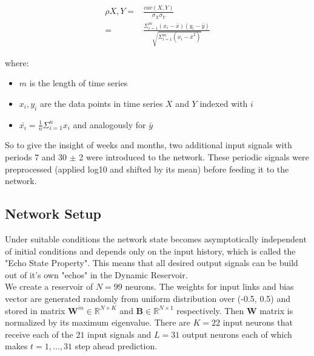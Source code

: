   \begin{equation}
  \begin{split}
	  \rho X,Y =& \frac{cov(X,Y)}{\sigma_X \sigma_Y}\\
		=& \frac{\Sigma^{m}_{i=1}(x_i - \bar{x})(y_i - \bar{y})} {\sqrt{\Sigma^m_{i=1}(x_i - \bar{x}^2)}}
  \end{split}
   \label{eq:pearson}
  \end{equation}
  
  where:
  \begin{itemize}
	  \item $m$ is the length of time series
	  \item $x_i, y_i$ are the data points in time series $X$ and $Y$ indexed with $i$
	  \item $\bar{x_i} = \frac{1}{n}\Sigma_{i=1}^{n}x_i$  and analogously for $\bar{y}$
	  
	  \end{itemize}
 
 
 So to give the insight of weeks and months, two additional input signals with periods 7 and 30 $\pm$ 2 were introduced to the network. These periodic signals were preprocessed (applied log10 and shifted by its mean) before feeding it to the network.



%


\subsection{Network Setup}
\indent \indent
    Under suitable conditions the network state becomes asymptotically independent of initial conditions and depends only on the input history, which is called the "Echo State Property". This means that all desired output signals can be build out of it's own "echos" in the Dynamic Reservoir. \cite{ESNinAudioProcessing}\\
	We create a reservoir of $N = 99$ neurons. %
	   The weights  for input links  
	 and bias vector 
	 are generated randomly from uniform distribution over (-0.5, 0.5) and stored in matrix $\mathbf{W}^{in} \in \mathbb{R}^{N\times K}$  and $\mathbf{B} \in \mathbb{R}^{N\times 1}$ respectively. Then 
	 $\mathbf{W}$ matrix is normalized by its maximum eigenvalue. There are $K=22$ input neurons that receive each of the $21$ input signals and $L=31$ output neurons each of which makes $t=1,\hdots,31$ step ahead prediction.
\\


